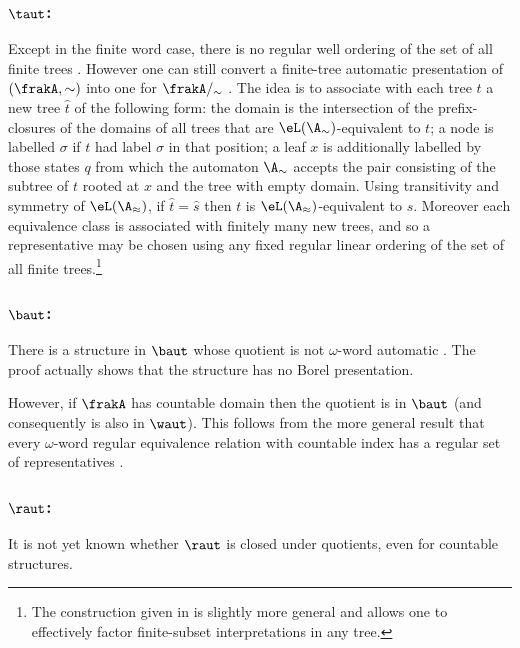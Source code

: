 \subsubsection*{$\taut$:}
Except in the finite word case, there is no regular well ordering of the set of
all finite trees \cite{CL07csl}. 
However one can still convert a finite-tree automatic presentation of $(\frakA,\sim)$ into
one for $\frakA/_\sim$ \cite{CL07LMCS}. The idea is to associate with each tree $t$ a
new tree $\hat{t}$ of the following form: the domain is the intersection 
of the prefix-closures of the domains of all trees that are $\eL(\A_\sim)$-equivalent to $t$; 
a node is labelled $\sigma$ if $t$ had label $\sigma$ in that position; 
a leaf $x$ is additionally labelled by those states $q$ from which the 
automaton $\A_{\sim}$ accepts the pair consisting of the subtree of $t$ 
rooted at $x$ and the tree with empty domain.
Using transitivity and symmetry of $\eL(\A_\approx)$, if $\hat{t} = \hat{s}$ 
then $t$ is $\eL(\A_\approx)$-equivalent to $s$. 
Moreover each equivalence class is associated with finitely many new trees, 
and so a representative may be chosen using any fixed regular linear ordering 
of the set of all finite trees.\footnote{The construction 
given in \cite{CL07LMCS} is slightly more general and allows one to effectively 
factor finite-subset interpretations in any tree.}



\subsubsection*{$\baut$:}
There is a structure in $\baut$ whose quotient is not $\omega$-word 
automatic \cite{HKMN08}. The proof actually shows that the structure has no Borel presentation.
 
However, if $\frakA$ has countable domain then the quotient is in $\baut$ (and consequently is also in
$\waut$). This follows from the more general result that every $\omega$-word
regular equivalence relation with countable index has a regular set of
representatives \cite{KRB08}.

\subsubsection*{$\raut$:}
It is not yet known whether $\raut$ is closed under quotients, even for countable structures. ~\\

